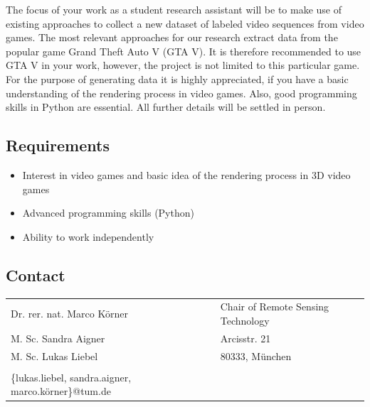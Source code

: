 \documentclass[lang=english]{tumposting}
\begin{document}
\noindent
The focus of your work as a student research assistant will be to make use of existing approaches to collect a new dataset of labeled video sequences from video games.
The most relevant approaches for our research extract data from the popular game Grand Theft Auto V (GTA V).
It is therefore recommended to use GTA V in your work, however, the project is not limited to this particular game. 
For the purpose of generating data it is highly appreciated, if you have a basic understanding of the rendering process in video games. 
Also, good programming skills in Python are essential. 
All further details will be settled in person.


\subsection{Requirements}
\begin{itemize}
	\item Interest in video games and basic idea of the rendering process in 3D video games
	\item Advanced programming skills (Python)
	\item Ability to work independently
\end{itemize}

\vspace*{2mm}
\hrulefill

\subsection{Contact}

\begin{tabular}[c]{ll}
	Dr. rer. nat. Marco Körner	& Chair of Remote Sensing Technology\\
	M. Sc. Sandra Aigner		& Arcisstr. 21 \\
	M. Sc. Lukas Liebel			& 80333, München\\
								& \\
	\{lukas.liebel, sandra.aigner, marco.körner\}@tum.de &
\end{tabular}
\end{document}
